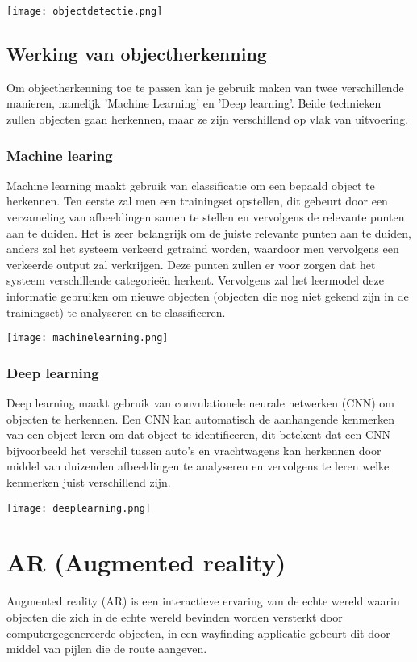 \texttt{[image: objectdetectie.png]}

\subsection{Werking van objectherkenning}
Om objectherkenning toe te passen kan je gebruik maken van twee verschillende manieren, namelijk 'Machine Learning' en 'Deep learning'. Beide technieken zullen objecten gaan herkennen, maar ze zijn verschillend op vlak van uitvoering.

\subsubsection{Machine learing}
Machine learning maakt gebruik van classificatie om een bepaald object te herkennen. Ten eerste zal men een trainingset opstellen, dit gebeurt door een verzameling van afbeeldingen samen te stellen en vervolgens de relevante punten aan te duiden. Het is zeer belangrijk om de juiste relevante punten aan te duiden, anders zal het systeem verkeerd getraind worden, waardoor men vervolgens een verkeerde output zal verkrijgen. Deze punten zullen er voor zorgen dat het systeem verschillende categorieën herkent. Vervolgens zal het leermodel deze informatie gebruiken om nieuwe objecten (objecten die nog niet gekend zijn in de trainingset) te analyseren en te classificeren.

\texttt{[image: machinelearning.png]}

\subsubsection{Deep learning}
Deep learning maakt gebruik van convulationele neurale netwerken (CNN) om objecten te herkennen. Een CNN kan automatisch de aanhangende kenmerken van een object leren om dat object te identificeren, dit betekent dat een CNN bijvoorbeeld het verschil tussen auto's en vrachtwagens kan herkennen door middel van duizenden afbeeldingen te analyseren en vervolgens te leren welke kenmerken juist verschillend zijn.

\texttt{[image: deeplearning.png]}
\section{AR (Augmented reality)}
Augmented reality (AR) is een interactieve ervaring van de echte wereld waarin objecten die zich in de echte wereld bevinden worden versterkt door computergegenereerde objecten, in een wayfinding applicatie gebeurt dit door middel van pijlen die de route aangeven.

